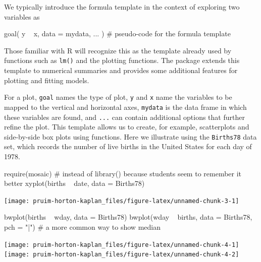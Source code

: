 We typically introduce the formula template in the context of exploring
two variables as

\begin{Schunk}
\begin{Sinput}
goal( y ~ x, data = mydata, ... )    # pseudo-code for the formula template
\end{Sinput}
\end{Schunk}

\noindent
Those familiar with R will recognize this as the template already used
by functions such as \texttt{lm()} and the  plotting
functions. The  package extends this template to numerical
summaries and provides some additional features for plotting and fitting
models.

For a plot, \texttt{goal} names the type of plot, \texttt{y} and
\texttt{x} name the variables to be mapped to the vertical and
horizontal axes, \texttt{mydata} is the data frame in which these
variables are found, and \texttt{...} can contain additional options
that further refine the plot. This template allows us to create, for
example, scatterplots and side-by-side box plots using 
functions. Here we illustrate using the \texttt{Births78} data set,
which records the number of live births in the United States for each
day of 1978.

\begin{Schunk}
\begin{Sinput}
require(mosaic)     # instead of library() because students seem to remember it better
xyplot(births ~ date, data = Births78)
\end{Sinput}


\begin{center}\texttt{[image: pruim-horton-kaplan\_files/figure-latex/unnamed-chunk-3-1]} \end{center}

\end{Schunk}\begin{Schunk}
\begin{Sinput}
bwplot(births ~ wday, data = Births78) 
bwplot(wday ~ births, data = Births78, pch = "|")  # a more common way to show median
\end{Sinput}


\begin{center}\texttt{[image: pruim-horton-kaplan\_files/figure-latex/unnamed-chunk-4-1]} \texttt{[image: pruim-horton-kaplan\_files/figure-latex/unnamed-chunk-4-2]} \end{center}

\end{Schunk}

